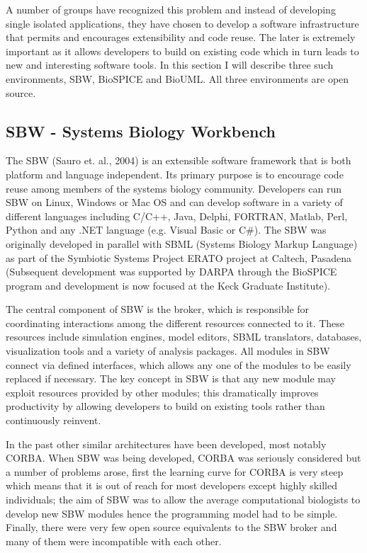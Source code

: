 \documentclass[12pt]{article}
\begin{document}
{A number of groups have recognized this problem and instead of
developing single isolated applications, they have chosen to
develop a software infrastructure that permits and encourages
extensibility and code reuse. The later is extremely important as
it allows developers to build on existing code which in turn leads
to new and interesting software tools. In this section I will
describe three such environments, SBW, BioSPICE and BioUML. All three
environments are open source.


\subsection{SBW - Systems Biology Workbench}

The SBW (Sauro et. al., 2004) is an extensible software framework
that is both platform and language independent. Its primary
purpose is to encourage code reuse among members of the systems
biology community. Developers can run SBW on Linux, Windows or Mac
OS and can develop software in a variety of different languages
including C/C++, Java, Delphi, FORTRAN, Matlab, Perl, Python and
any .NET language (e.g. Visual Basic or C\#). The SBW was originally
developed in parallel with SBML (Systems Biology Markup Language)
as part of the Symbiotic Systems Project ERATO project at Caltech,
Pasadena (Subsequent development was supported by DARPA through the BioSPICE program and development is now focused at the Keck Graduate Institute). 

The central component of SBW is the broker, which is responsible for coordinating interactions among the different resources connected to it. These resources include simulation
engines, model editors, SBML translators, databases, visualization
tools and a variety of analysis packages. All modules in SBW
connect via defined interfaces, which allows any one of the
modules to be easily replaced if necessary. The key concept in SBW
is that any new module may exploit resources provided by other
modules; this dramatically improves productivity by allowing
developers to build on existing tools rather than continuously
reinvent.

In the past other similar architectures have been developed, most notably
CORBA. When SBW was being developed, CORBA was seriously considered but
a number of problems arose, first the learning curve for CORBA is very steep which
means that it is out of reach for most developers except highly skilled individuals;
the aim of SBW was to allow the average computational biologists to develop new SBW modules hence the programming model had to be simple. Finally, there were very few
open source equivalents to the SBW broker and many of them were incompatible with each other.


}
\end{document}
